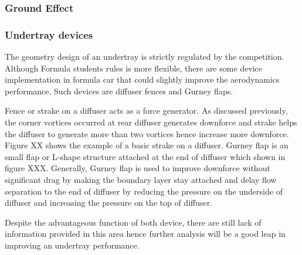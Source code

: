 \subsubsection{Ground Effect}


\subsubsection{Undertray devices}
The geometry design of an undertray is strictly regulated by the competition. Although Formula students rules is more flexible, there are some device implementation in formula car that could slightly improve the aerodynamics performance. Such devices are diffuser fences and Gurney flaps.

Fence or strake on a diffuser acts as a force generator. As discussed previously, the corner vortices occurred at rear diffuser generates downforce and strake helps the diffuser to generate more than two vortices hence increase more downforce. Figure XX shows the example of a basic strake on a diffuser. Gurney flap is an small flap or L-shape structure attached at the end of diffuser which shown in figure XXX. Generally, Gurney flap is used to improve downforce without significant drag by making the boundary layer stay attached and delay flow separation to the end of diffuser by reducing the pressure on the underside of diffuser and increasing the pressure on the top of diffuser. 


Despite the advantageous function of both device, there are still lack of information provided in this area hence further analysis will be a good leap in improving an undertray performance.  
